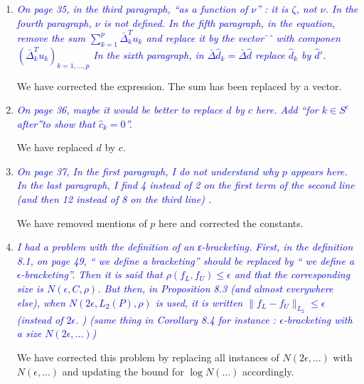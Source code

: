 \documentclass[pdftex,12pt]{article}
\let\hat\widehat
\def\rc#1{{\it\textcolor{blue}{#1}}\smallskip}
\begin{document}
\begin{enumerate}
\item \rc{On page 35, in the third paragraph, ``as a function of $\nu$'' : it is
$\zeta$, not $\nu$. In the fourth paragraph, $\nu$ is not defined. In the fifth
paragraph, in the equation, remove the sum $\sum_{k=1}^p
\bar\Delta_k^T u_k$  and replace
it by the vector ̄ˆ with componen$(\bar\Delta_k^T u_k)_{k=1,\ldots, p}$ In the sixth paragraph,
in $\bar\Delta \hat d_k = \bar\Delta\hat d$ replace $\hat d_k$ by
$\hat d'$.}

We have corrected the expression. The sum has been replaced by a vector.

\item \rc{On page 36, maybe it would be better to replace $d$ by $c$ here. Add
``for $k\in S^c$ after''to show that $\hat c_k =0$''.}

We have replaced $d$ by $c$. 

\item \rc{On page 37, In the first paragraph, I do not understand why $p$ appears
here. In the last paragraph, I find 4 instead of 2 on the first term of
the second line (and then 12 instead of 8 on the third line) .}

We have removed mentions of $p$ here and corrected the constants.




\item \rc{I had a problem with the definition of an ε-bracketing. First, in the
definition 8.1, on page 49, `` we define a bracketing'' should be
replaced by `` we define a $\epsilon$-bracketing''. Then it is said that $\rho(f_L ,
f_U ) \leq \epsilon$ and that the corresponding size is $N(\epsilon,C,\rho)$. But then, in
Proposition 8.3 (and almost everywhere else), when $N(2\epsilon,L_2(P),\rho)$ is
used, it is written $\|f_L − f_U \|_{L_2} \leq \epsilon$ (instead of $2\epsilon$. ) (same thing in
Corollary 8.4 for instance : $\epsilon$-bracketing with a size $N(2\epsilon,...)$)}

We have corrected this problem by replacing all instances of $N(2\epsilon,...)$ with $N(\epsilon, ...)$ and updating the bound for $\log N(...)$ accordingly. 


\end{enumerate}
\end{document}
